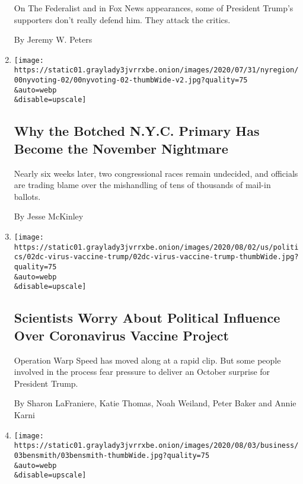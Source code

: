 \begin{enumerate}
  On The Federalist and in Fox News appearances, some of President
  Trump's supporters don't really defend him. They attack the critics.

  By Jeremy W. Peters
\item
  \href{/2020/08/03/nyregion/nyc-mail-ballots-voting.html}{}

  \texttt{[image: https://static01.graylady3jvrrxbe.onion/images/2020/07/31/nyregion/00nyvoting-02/00nyvoting-02-thumbWide-v2.jpg?quality=75\\\&auto=webp\\\&disable=upscale]}

  \hypertarget{why-the-botched-nyc-primary-has-become-the-november-nightmare}{%
  \subsection{Why the Botched N.Y.C. Primary Has Become the November
  Nightmare}\label{why-the-botched-nyc-primary-has-become-the-november-nightmare}}

  Nearly six weeks later, two congressional races remain undecided, and
  officials are trading blame over the mishandling of tens of thousands
  of mail-in ballots.

  By Jesse McKinley
\item
  \href{/2020/08/02/us/politics/coronavirus-vaccine.html}{}

  \texttt{[image: https://static01.graylady3jvrrxbe.onion/images/2020/08/02/us/politics/02dc-virus-vaccine-trump/02dc-virus-vaccine-trump-thumbWide.jpg?quality=75\\\&auto=webp\\\&disable=upscale]}

  \hypertarget{scientists-worry-about-political-influence-over-coronavirus-vaccine-project}{%
  \subsection{Scientists Worry About Political Influence Over
  Coronavirus Vaccine
  Project}\label{scientists-worry-about-political-influence-over-coronavirus-vaccine-project}}

  Operation Warp Speed has moved along at a rapid clip. But some people
  involved in the process fear pressure to deliver an October surprise
  for President Trump.

  By Sharon LaFraniere, Katie Thomas, Noah Weiland, Peter Baker and
  Annie Karni
\item
  \href{/2020/08/02/business/media/election-coverage.html}{}

  \texttt{[image: https://static01.graylady3jvrrxbe.onion/images/2020/08/03/business/03bensmith/03bensmith-thumbWide.jpg?quality=75\\\&auto=webp\\\&disable=upscale]}


\end{enumerate}

